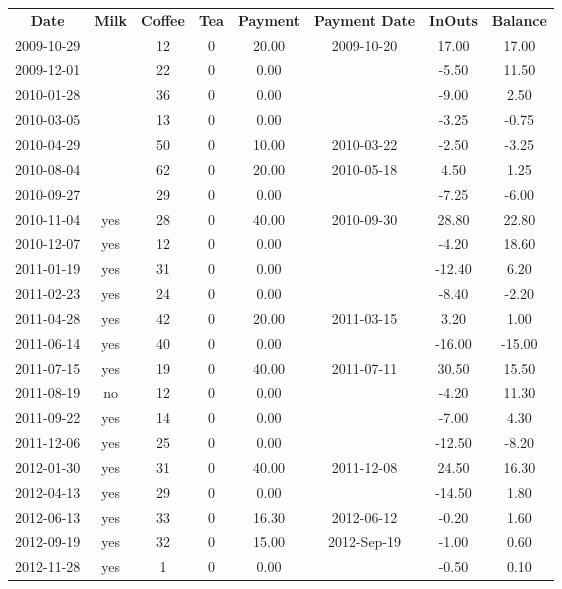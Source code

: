 \begin{center}
\begin{tabular}{cccccccc}
\textbf{Date} & \textbf{Milk} & \textbf{Coffee} & \textbf{Tea} & \textbf{Payment} & \textbf{Payment Date} & \textbf{InOuts} & \textbf{Balance} \\
2009-10-29 &  & 12 & 0 & 20.00 & 2009-10-20 &  17.00 &  17.00\\ 
2009-12-01 &  & 22 & 0 &  0.00 &  &  -5.50 &  11.50\\ 
2010-01-28 &  & 36 & 0 &  0.00 &  &  -9.00 &   2.50\\ 
2010-03-05 &  & 13 & 0 &  0.00 &  &  -3.25 &  -0.75\\ 
2010-04-29 &  & 50 & 0 & 10.00 & 2010-03-22 &  -2.50 &  -3.25\\ 
2010-08-04 &  & 62 & 0 & 20.00 & 2010-05-18 &   4.50 &   1.25\\ 
2010-09-27 &  & 29 & 0 &  0.00 &  &  -7.25 &  -6.00\\ 
2010-11-04 & yes & 28 & 0 & 40.00 & 2010-09-30 &  28.80 &  22.80\\ 
2010-12-07 & yes & 12 & 0 &  0.00 &  &  -4.20 &  18.60\\ 
2011-01-19 & yes & 31 & 0 &  0.00 &  & -12.40 &   6.20\\ 
2011-02-23 & yes & 24 & 0 &  0.00 &  &  -8.40 &  -2.20\\ 
2011-04-28 & yes & 42 & 0 & 20.00 & 2011-03-15 &   3.20 &   1.00\\ 
2011-06-14 & yes & 40 & 0 &  0.00 &  & -16.00 & -15.00\\ 
2011-07-15 & yes & 19 & 0 & 40.00 & 2011-07-11 &  30.50 &  15.50\\ 
2011-08-19 & no & 12 & 0 &  0.00 &  &  -4.20 &  11.30\\ 
2011-09-22 & yes & 14 & 0 &  0.00 &  &  -7.00 &   4.30\\ 
2011-12-06 & yes & 25 & 0 &  0.00 &  & -12.50 &  -8.20\\ 
2012-01-30 & yes & 31 & 0 & 40.00 & 2011-12-08 &  24.50 &  16.30\\ 
2012-04-13 & yes & 29 & 0 &  0.00 &  & -14.50 &   1.80\\ 
2012-06-13 & yes & 33 & 0 & 16.30 & 2012-06-12 &  -0.20 &   1.60\\ 
2012-09-19 & yes & 32 & 0 & 15.00 & 2012-Sep-19 &  -1.00 &   0.60\\ 
2012-11-28 & yes &  1 & 0 &  0.00 &  &  -0.50 &   0.10
\end{tabular}
\end{center}

